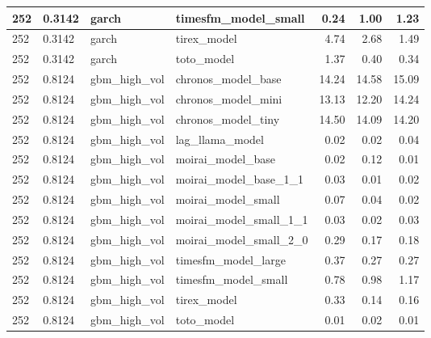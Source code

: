 {\begin{tabular}{llllrrr}
\midrule
252 & 0.3142 & garch & timesfm\_model\_small & 0.24 & 1.00 & 1.23 \\
\midrule
252 & 0.3142 & garch & tirex\_model & 4.74 & 2.68 & 1.49 \\
\midrule
252 & 0.3142 & garch & toto\_model & 1.37 & 0.40 & 0.34 \\
\midrule
252 & 0.8124 & gbm\_high\_vol & chronos\_model\_base & 14.24 & 14.58 & 15.09 \\
\midrule
252 & 0.8124 & gbm\_high\_vol & chronos\_model\_mini & 13.13 & 12.20 & 14.24 \\
\midrule
252 & 0.8124 & gbm\_high\_vol & chronos\_model\_tiny & 14.50 & 14.09 & 14.20 \\
\midrule
252 & 0.8124 & gbm\_high\_vol & lag\_llama\_model & 0.02 & 0.02 & 0.04 \\
\midrule
252 & 0.8124 & gbm\_high\_vol & moirai\_model\_base & 0.02 & 0.12 & 0.01 \\
\midrule
252 & 0.8124 & gbm\_high\_vol & moirai\_model\_base\_1\_1 & 0.03 & 0.01 & 0.02 \\
\midrule
252 & 0.8124 & gbm\_high\_vol & moirai\_model\_small & 0.07 & 0.04 & 0.02 \\
\midrule
252 & 0.8124 & gbm\_high\_vol & moirai\_model\_small\_1\_1 & 0.03 & 0.02 & 0.03 \\
\midrule
252 & 0.8124 & gbm\_high\_vol & moirai\_model\_small\_2\_0 & 0.29 & 0.17 & 0.18 \\
\midrule
252 & 0.8124 & gbm\_high\_vol & timesfm\_model\_large & 0.37 & 0.27 & 0.27 \\
\midrule
252 & 0.8124 & gbm\_high\_vol & timesfm\_model\_small & 0.78 & 0.98 & 1.17 \\
\midrule
252 & 0.8124 & gbm\_high\_vol & tirex\_model & 0.33 & 0.14 & 0.16 \\
\midrule
252 & 0.8124 & gbm\_high\_vol & toto\_model & 0.01 & 0.02 & 0.01 \\
\bottomrule
\end{tabular}
}